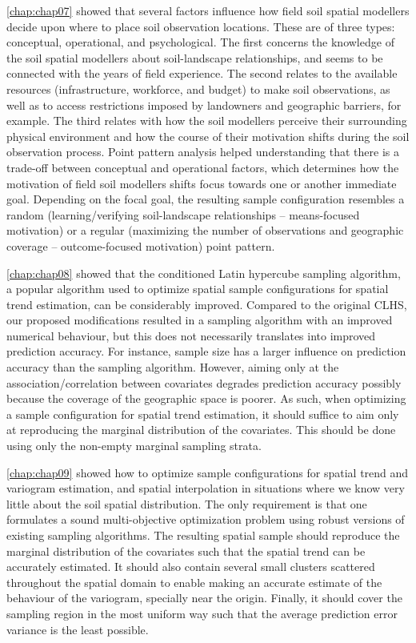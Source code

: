 \autoref{chap:chap07} showed that several factors influence how field soil spatial modellers decide upon where 
to place soil observation locations. These are of three types: conceptual, operational, and psychological. The 
first concerns the knowledge of the soil spatial modellers about soil-landscape relationships, and seems to be 
connected with the years of field experience. The second relates to the available resources (infrastructure, 
workforce, and budget) to make soil observations, as well as to access restrictions imposed by landowners and 
geographic barriers, for example. The third relates with how the soil modellers perceive their surrounding 
physical environment and how the course of their motivation shifts during the soil observation process. Point 
pattern analysis helped understanding that there is a trade-off between conceptual and operational factors, 
which determines how the motivation of field soil modellers shifts focus towards one or another immediate goal. 
Depending on the focal goal, the resulting sample configuration resembles a random (learning/verifying 
soil-landscape relationships -- means-focused motivation) or a regular (maximizing the number of observations 
and geographic coverage -- outcome-focused motivation) point pattern.

\autoref{chap:chap08} showed that the conditioned Latin hypercube sampling algorithm, a popular algorithm used 
to optimize spatial sample configurations for spatial trend estimation, can be considerably improved. Compared 
to the original CLHS, our proposed modifications resulted in a sampling algorithm with an improved numerical 
behaviour, but this does not necessarily translates into improved prediction accuracy. For instance, sample 
size has a larger influence on prediction accuracy than the sampling algorithm. However, aiming only at the 
association/correlation between covariates degrades prediction accuracy possibly because the coverage of the 
geographic space is poorer. As such, when optimizing a sample configuration for spatial trend estimation, it 
should suffice to aim only at reproducing the marginal distribution of the covariates. This should be done 
using only the non-empty marginal sampling strata.

\autoref{chap:chap09} showed how to optimize sample configurations for spatial trend and variogram estimation, 
and spatial interpolation in situations where we know very little about the soil spatial distribution. The only 
requirement is that one formulates a sound multi-objective optimization problem using robust versions of 
existing sampling algorithms. The resulting spatial sample should reproduce the marginal distribution of the 
covariates such that the spatial trend can be accurately estimated. It should also contain several small 
clusters scattered throughout the spatial domain to enable making an accurate estimate of the behaviour of the 
variogram, specially near the origin. Finally, it should cover the sampling region in the most uniform way such 
that the average prediction error variance is the least possible.

